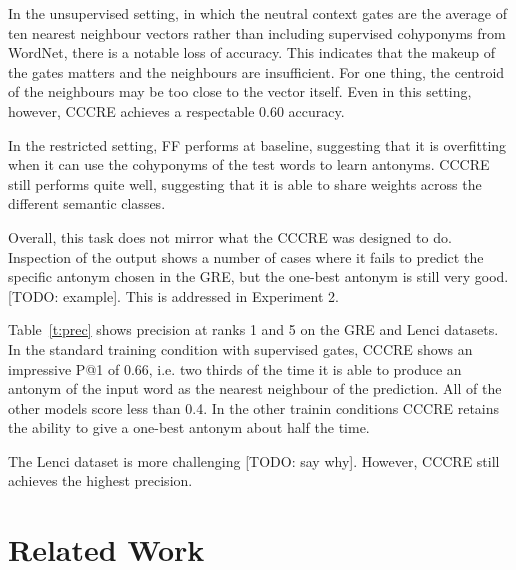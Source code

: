\documentclass[11pt]{article}
\begin{document}
In the unsupervised setting, in which the neutral context gates are the average of ten nearest neighbour vectors rather than including supervised cohyponyms from WordNet, there is a notable loss of accuracy. This indicates that the makeup of the gates matters and the neighbours are insufficient. For one thing, the centroid of the neighbours may be too close to the vector itself. Even in this setting, however, CCCRE achieves a respectable 0.60 accuracy.


In the restricted setting, FF performs at baseline, suggesting that it is overfitting when it can use the cohyponyms of the test words to learn antonyms. CCCRE still performs quite well, suggesting that it is able to share weights across the different semantic classes.

Overall, this task does not mirror what the CCCRE was designed to do. Inspection of the output shows a number of cases where it fails to predict the specific antonym chosen in the GRE, but the one-best antonym is still very good. [TODO: example]. This is addressed in Experiment 2.


Table~\ref{t:prec} shows precision at ranks 1 and 5 on the GRE and Lenci datasets. In the standard training condition with supervised gates, CCCRE shows an impressive P@1 of 0.66, i.e. two thirds of the time it is able to produce an antonym of the input word as the nearest neighbour of the prediction. All of the other models score less than 0.4. In the other trainin conditions CCCRE retains the ability to give a one-best antonym about half the time.

The Lenci dataset is more challenging [TODO: say why]. However, CCCRE still achieves the highest precision.


\section{Related Work}
\end{document}
